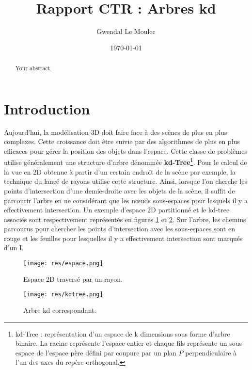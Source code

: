 \documentclass[a4paper]{article}
\title{Rapport CTR : Arbres kd}
\author{Gwendal Le Moulec}
\date{\today}
\begin{document}
\maketitle

\begin{abstract}
Your abstract.
\end{abstract}

\section{Introduction}

Aujourd'hui, la modélisation 3D doit faire face à des scènes de plus en plus complexes. Cette croissance doit être suivie par des algorithmes de plus en plus efficaces pour gérer la position des objets dans l'espace. Cette classe de problèmes utilise généralement une structure d'arbre dénommée \textbf{kd-Tree}\footnote{kd-Tree : représentation d'un espace de k dimensions sous forme d'arbre binaire. La racine représente l'espace entier et chaque fils représente un sous-espace de l'espace père défini par coupure par un plan $P$ perpendiculaire à l'un des axes du repère orthogonal.}. Pour le calcul de la vue en 2D obtenue à partir d'un certain endroit de la scène par exemple, la technique du lancé de rayons utilise cette structure. Ainsi, lorsque l'on cherche les points d'intersection d'une demie-droite avec les objets de la scène, il suffit de parcourir l'arbre en ne considérant que les nœuds sous-espaces pour lesquels il y a effectivement intersection. Un exemple d'espace 2D partitionné et le kd-tree associés sont respectivement représentés en figures \ref{fig:espace} et \ref{fig:kdtree}. Sur l'arbre, les chemins parcourus pour chercher les points d'intersection avec les sous-espaces sont en rouge et les feuilles pour lesquelles il y a effectivement intersection sont marqués d'un I.

\begin{figure}[!h]
\centering
\texttt{[image: res/espace.png]}
\caption{\label{fig:espace}Espace 2D traversé par un rayon.}
\end{figure}

\begin{figure}[!h]
\centering
\texttt{[image: res/kdtree.png]}
\caption{\label{fig:kdtree}Arbre kd correspondant.}
\end{figure}
\end{document}
